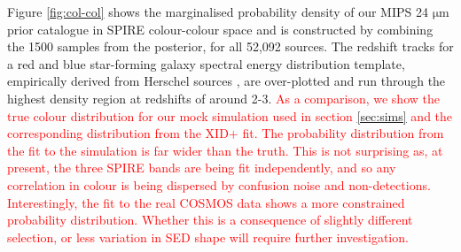 \documentclass[useAMS,usenatbib]{mnras}
\begin{document}
Figure \ref{fig:col-col} shows the marginalised probability density of our MIPS 24 $\mathrm{\mu m}$ prior catalogue in SPIRE colour-colour space and is  constructed by combining the 1500 samples from the posterior, for all 52,092 sources. The redshift tracks for a red and blue star-forming galaxy spectral energy distribution template, empirically derived from Herschel sources \citep{Berta:2013}, are over-plotted and run through the highest density region at redshifts of around 2-3. \textcolor{red}{As a comparison, we show the true colour distribution for our mock simulation used in section \ref{sec:sims} and the corresponding distribution from the \textsc{XID+} fit. The probability distribution from the fit to the simulation is far wider than the truth. This is not surprising as, at present, the three SPIRE bands are being fit independently, and so any correlation in colour is being dispersed by confusion noise and non-detections. Interestingly, the fit to the real COSMOS data shows a more constrained probability distribution. Whether this is a consequence of slightly different selection, or less variation in SED shape will require further investigation.}


\end{document}

